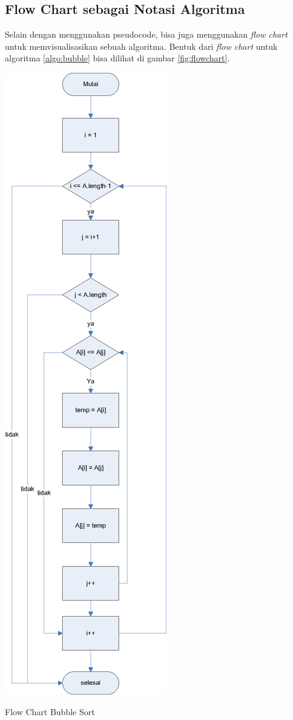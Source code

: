 \subsection{Flow Chart sebagai Notasi Algoritma}
Selain dengan menggunakan pseudocode, bisa juga menggunakan \textit{flow chart} untuk memvisualisasikan sebuah algoritma. Bentuk dari \textit{flow chart} untuk algoritma \ref{algo:bubble} bisa dilihat di gambar \ref{fig:flowchart}.

\begin{marginfigure}%
\includegraphics[scale=0.6]{fig/flowchart.eps}%
\caption{Flow Chart Bubble Sort}%
\label{fig:flowchart}%
\end{marginfigure}

